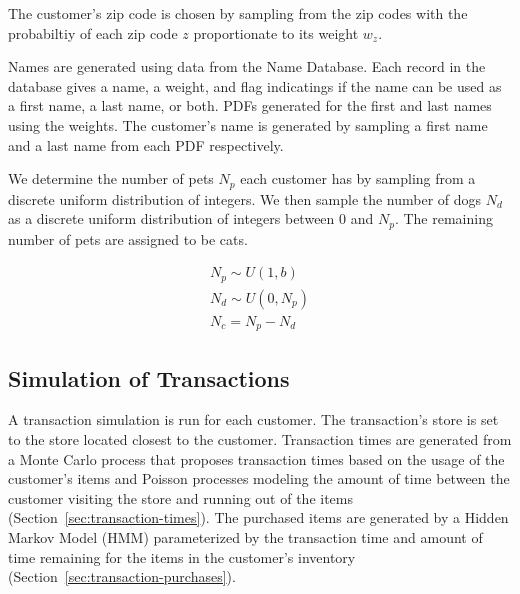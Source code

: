 \documentclass[conference]{IEEEtran}
\begin{document}
The customer's zip code is chosen by sampling from the zip codes with the probabiltiy of each zip code $z$ proportionate to its weight $w_z$.

Names are generated using data from the Name Database\cite{NameDB}. Each record in the database gives a name, a weight, and flag indicatings if the name can be used as a first name, a last name, or both.  PDFs generated for the first and last names using the weights.  The customer's name is generated by sampling a first name and a last name from each PDF respectively.

We determine the number of pets $N_p$ each customer has by sampling from a discrete uniform distribution of integers. We then sample the number of dogs $N_d$ as a discrete uniform distribution of integers between 0 and $N_p$.  The remaining number of pets are assigned to be cats.

\begin{align*}
N_p \sim U(1, b) \\
N_d \sim U(0, N_p) \\
N_c = N_p - N_d
\end{align*}

\subsection{Simulation of Transactions}
A transaction simulation is run for each customer. The transaction's store is set to the store located closest to the customer.  Transaction times are generated from a Monte Carlo process that proposes transaction times based on the usage of the customer's items and Poisson processes modeling the amount of time between the customer visiting the store and running out of the items (Section~\ref{sec:transaction-times}).  The purchased items are generated by a Hidden Markov Model (HMM) parameterized by the transaction time and amount of time remaining for the items in the customer's inventory (Section~\ref{sec:transaction-purchases}).
\end{document}

